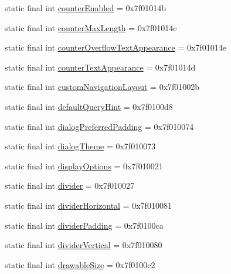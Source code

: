 \begin{CompactItemize}
\item 
static final int \hyperlink{classandroid_1_1support_1_1coreutils_1_1_r_1_1attr_31dd65cecffac7130170d9f63a11055b}{counterEnabled} = 0x7f01014b
\item 
static final int \hyperlink{classandroid_1_1support_1_1coreutils_1_1_r_1_1attr_3200a25041c0685a9bb02330d4123cb9}{counterMaxLength} = 0x7f01014c
\item 
static final int \hyperlink{classandroid_1_1support_1_1coreutils_1_1_r_1_1attr_dfe538a6b0db5d8525acfa539b7e747d}{counterOverflowTextAppearance} = 0x7f01014e
\item 
static final int \hyperlink{classandroid_1_1support_1_1coreutils_1_1_r_1_1attr_66eef355c169657ba22b2b0ebee60b83}{counterTextAppearance} = 0x7f01014d
\item 
static final int \hyperlink{classandroid_1_1support_1_1coreutils_1_1_r_1_1attr_ec3813e3780a2debe7e4a91da2b97cc8}{customNavigationLayout} = 0x7f01002b
\item 
static final int \hyperlink{classandroid_1_1support_1_1coreutils_1_1_r_1_1attr_3ca476fe6f0645e8407dd80e4a7211f6}{defaultQueryHint} = 0x7f0100d8
\item 
static final int \hyperlink{classandroid_1_1support_1_1coreutils_1_1_r_1_1attr_002eddd3a0b595e5f2fe5ddbd7226551}{dialogPreferredPadding} = 0x7f010074
\item 
static final int \hyperlink{classandroid_1_1support_1_1coreutils_1_1_r_1_1attr_5638418ce59f939205c7a8f193641058}{dialogTheme} = 0x7f010073
\item 
static final int \hyperlink{classandroid_1_1support_1_1coreutils_1_1_r_1_1attr_6e125a106b7eb84cbac6e1ba2bbf79e7}{displayOptions} = 0x7f010021
\item 
static final int \hyperlink{classandroid_1_1support_1_1coreutils_1_1_r_1_1attr_363df77a1e84707c4607532840bba6e0}{divider} = 0x7f010027
\item 
static final int \hyperlink{classandroid_1_1support_1_1coreutils_1_1_r_1_1attr_fed1dfa87de44d101965062fb8ff5690}{dividerHorizontal} = 0x7f010081
\item 
static final int \hyperlink{classandroid_1_1support_1_1coreutils_1_1_r_1_1attr_9f7f2917788a64756c76c5defac91743}{dividerPadding} = 0x7f0100ca
\item 
static final int \hyperlink{classandroid_1_1support_1_1coreutils_1_1_r_1_1attr_1c12d605d1eae5be1674f2af474975a5}{dividerVertical} = 0x7f010080
\item 
static final int \hyperlink{classandroid_1_1support_1_1coreutils_1_1_r_1_1attr_fb711fd263a47703cde855fef5d0dc47}{drawableSize} = 0x7f0100c2

\end{CompactItemize}
